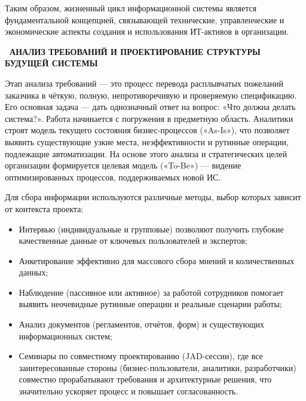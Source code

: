 \documentclass{SibFU-docs}
\begin{document}
\vspace{1em}

Таким образом, жизненный цикл информационной системы является фундаментальной концепцией, связывающей технические, управленческие и экономические аспекты создания и использования ИТ-активов в организации. \cite{gost3460190, ISO12207_2017, OGC_ITIL_2007}


\newpage
{}
\begin{center}\textbf{\thesection\ АНАЛИЗ ТРЕБОВАНИЙ И ПРОЕКТИРОВАНИЕ СТРУКТУРЫ БУДУЩЕЙ СИСТЕМЫ}\end{center}
\vspace*{-1.5em}

Этап анализа требований — это процесс перевода расплывчатых пожеланий заказчика в чёткую, полную, непротиворечивую и проверяемую спецификацию. Его основная задача — дать однозначный ответ на вопрос: «Что должна делать система?». Работа начинается с погружения в предметную область. Аналитики строят модель текущего состояния бизнес-процессов («As-Is»), что позволяет выявить существующие узкие места, неэффективности и рутинные операции, подлежащие автоматизации. На основе этого анализа и стратегических целей организации формируется целевая модель («To-Be») — видение оптимизированных процессов, поддерживаемых новой ИС.


Для сбора информации используются различные методы, выбор которых зависит от контекста проекта:

\begin{itemize}[label=-]
\item Интервью (индивидуальные и групповые) позволяют получить глубокие качественные данные от ключевых пользователей и экспертов;
\item Анкетирование эффективно для массового сбора мнений и количественных данных;
\item Наблюдение (пассивное или активное) за работой сотрудников помогает выявить неочевидные рутинные операции и реальные сценарии работы;
\item Анализ документов (регламентов, отчётов, форм) и существующих информационных систем;
\item Семинары по совместному проектированию (JAD-сессии), где все заинтересованные стороны (бизнес-пользователи, аналитики, разработчики) совместно прорабатывают требования и архитектурные решения, что значительно ускоряет процесс и повышает согласованность.
\end{itemize}
\end{document}
